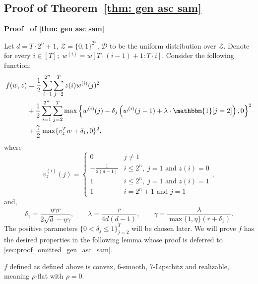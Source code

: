 \documentclass[11pt]{article}
\newcommand{\rad}{r}
\renewenvironment{proof}[1][]{%
  \par\noindent\textbf{\upshape Proof%
  \if\relax\detokenize{#1}\relax\else\ #1\fi}\ %
}{\jmlrQED}
\begin{document}
\subsection{Proof of Theorem~\ref{thm: gen asc sam}}\label{sec:proof_gen_asc_sam}



\begin{proof}[of \cref{thm: gen asc sam}]
Let $d = T \cdot 2^n + 1$, $\mathcal{Z}= \{0,1\}^{2^n}$, $\mathcal{D}$ to be the uniform distribution over $\mathcal{Z}$. Denote for every $i \in [T]; \; w^{(i)} = w[T\cdot (i-1) + 1 : T \cdot i]$.  Consider the following function:
\begin{align*}
    f(w,z) & = \frac{1}{2}\sum_{i=1}^{2^n} \sum_{j=2}^T z(i) w^{(i)}(j)^2 \\
    & + \frac{1}{2}\sum_{i=1}^{2^n} \sum_{j=2}^T \max\left\{w^{(i)}(j) - \delta_j \left( w^{(i)}(j-1) + \lambda \cdot \mathbbm{1}[j=2]\right),0\right\}^2  \\
    & + \frac{\gamma}{2} \max\{v_z^Tw + \delta_1,0\}^2, 
\end{align*}
where 
$$v_z^{(i)}(j) = \begin{cases}
    0 & j \neq 1 \\
    -\frac{1}{2(d-1)} & i \leq 2^n, \; j = 1 \text{ and } z(i) = 0 \\
    1 & i \leq 2^n, \; j = 1 \text{ and } z(i) = 1\\
    1 & i = 2^n + 1 \text{ and } j = 1
\end{cases},$$
and, 
$$\delta_1 = \frac{\eta \gamma \rad}{2\sqrt{d}-\eta\gamma}, \qquad \lambda = \frac{\rad}{4d(d-1)},\qquad \gamma = \frac{\lambda}{\max\{1, \eta\} (\rad+\delta_1)}.$$
The positive parameters $\{0 <\delta_j \leq 1\}_{j=2}^T$ will be chosen later. We will prove $f$ has the desired properties in the following lemma whose proof is deferred to \cref{sec:proof_omitted_gen_asc_sam}.
\begin{lemma}\label{lemma: f properties ascent sam}
    $f$ defined as defined above is convex, $6$-smooth, $7$-Lipschitz and realizable, meaning $\rho$-flat with $\rho=0$.  
\end{lemma}


\end{proof}
\end{document}

